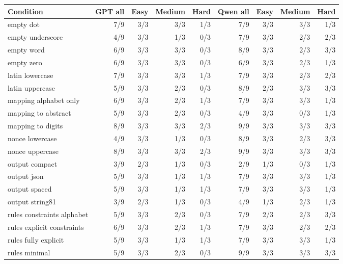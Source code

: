 \begin{tabular}{p{4.4cm}rrrrrrrr}
\toprule
Condition & GPT all & Easy & Medium & Hard & Qwen all & Easy & Medium & Hard\\
\midrule
empty dot & 7/9 & 3/3 & 3/3 & 1/3 & 7/9 & 3/3 & 3/3 & 1/3\\
empty underscore & 4/9 & 3/3 & 1/3 & 0/3 & 7/9 & 3/3 & 2/3 & 2/3\\
empty word & 6/9 & 3/3 & 3/3 & 0/3 & 8/9 & 3/3 & 2/3 & 3/3\\
empty zero & 6/9 & 3/3 & 3/3 & 0/3 & 6/9 & 3/3 & 2/3 & 1/3\\
latin lowercase & 7/9 & 3/3 & 3/3 & 1/3 & 7/9 & 3/3 & 2/3 & 2/3\\
latin uppercase & 5/9 & 3/3 & 2/3 & 0/3 & 8/9 & 2/3 & 3/3 & 3/3\\
mapping alphabet only & 6/9 & 3/3 & 2/3 & 1/3 & 7/9 & 3/3 & 3/3 & 1/3\\
mapping to abstract & 5/9 & 3/3 & 2/3 & 0/3 & 4/9 & 3/3 & 0/3 & 1/3\\
mapping to digits & 8/9 & 3/3 & 3/3 & 2/3 & 9/9 & 3/3 & 3/3 & 3/3\\
nonce lowercase & 4/9 & 3/3 & 1/3 & 0/3 & 8/9 & 3/3 & 2/3 & 3/3\\
nonce uppercase & 8/9 & 3/3 & 3/3 & 2/3 & 9/9 & 3/3 & 3/3 & 3/3\\
output compact & 3/9 & 2/3 & 1/3 & 0/3 & 2/9 & 1/3 & 0/3 & 1/3\\
output json & 5/9 & 3/3 & 1/3 & 1/3 & 7/9 & 3/3 & 3/3 & 1/3\\
output spaced & 5/9 & 3/3 & 1/3 & 1/3 & 7/9 & 3/3 & 3/3 & 1/3\\
output string81 & 3/9 & 2/3 & 1/3 & 0/3 & 4/9 & 1/3 & 2/3 & 1/3\\
rules constraints alphabet & 5/9 & 3/3 & 2/3 & 0/3 & 7/9 & 2/3 & 2/3 & 3/3\\
rules explicit constraints & 6/9 & 3/3 & 2/3 & 1/3 & 7/9 & 3/3 & 2/3 & 2/3\\
rules fully explicit & 5/9 & 3/3 & 1/3 & 1/3 & 7/9 & 3/3 & 3/3 & 1/3\\
rules minimal & 5/9 & 3/3 & 2/3 & 0/3 & 9/9 & 3/3 & 3/3 & 3/3\\
\bottomrule
\end{tabular}

